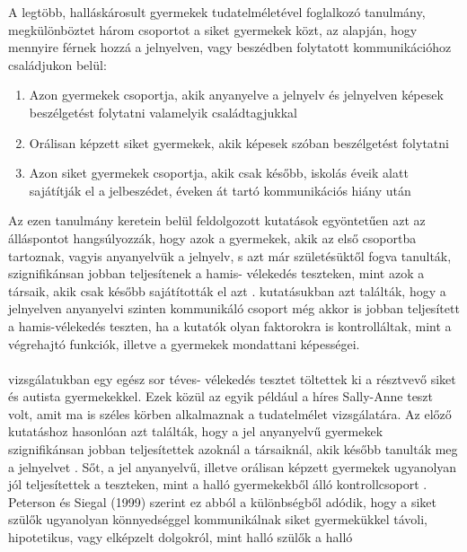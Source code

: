 A legtöbb, halláskárosult gyermekek tudatelméletével foglalkozó tanulmány, megkülön\-böztet
három csoportot a siket gyermekek közt, az alapján, hogy mennyire férnek hozzá a
jelnyelven, vagy beszédben folytatott kommunikációhoz családjukon belül:
\begin{enumerate}
	\item Azon gyermekek csoportja, akik anyanyelve a jelnyelv és jelnyelven képesek
	beszél\-getést folytatni valamelyik családtagjukkal
	\item Orálisan képzett siket gyermekek, akik képesek szóban beszélgetést folytatni
	\item Azon siket gyermekek csoportja, akik csak később, iskolás éveik alatt sajátítják el a
	jelbeszédet, éveken át tartó kommunikációs hiány után
\end{enumerate}
Az ezen tanulmány keretein belül feldolgozott kutatások egyöntetűen azt az álláspontot
hangsúlyozzák, hogy azok a gyermekek, akik az első csoportba tartoznak, vagyis anyanyelvük
a jelnyelv, s azt már születésüktől fogva tanulták, szignifikánsan jobban teljesítenek a hamis-
vélekedés teszteken, mint azok a társaik, akik csak később sajátították el azt \autocite{woolfe_want_siegal_2002,peterson_siegal_1999,peterson_slaughter_2006,schick_villiers_villiers_hoffmeister_2007}.
\textcite{woolfe_want_siegal_2002} kutatásukban azt találták, hogy a jelnyelven anyanyelvi
szinten kommunikáló csoport még akkor is jobban teljesített a hamis-vélekedés teszten, ha a
kutatók olyan faktorokra is kontrolláltak, mint a végrehajtó funkciók, illetve a gyermekek
mondattani képességei.\\
\\
 \textcite{peterson_siegal_1999} vizsgálatukban egy egész sor téves-
vélekedés tesztet töltettek ki a résztvevő siket és autista gyermekekkel. Ezek közül az egyik például a híres Sally-Anne teszt \autocite{baron-cohen_leslie_frith_1985} volt, amit ma is széles körben alkalmaznak a tudatelmélet vizsgálatára. Az előző kutatáshoz
hasonlóan azt találták, hogy a jel anyanyelvű gyermekek szignifikánsan jobban teljesítettek
azoknál a társaiknál, akik később tanulták meg a jelnyelvet \autocite{peterson_siegal_1999}. Sőt, a jel anyanyelvű,
illetve orálisan képzett gyermekek ugyanolyan jól teljesítettek a teszteken, mint a halló
gyermekekből álló kontrollcsoport \autocite{peterson_siegal_1999}. Peterson és Siegal (1999) szerint ez abból a
különbségből adódik, hogy a siket szülők ugyanolyan könnyedséggel kommunikálnak siket
gyermekükkel távoli, hipotetikus, vagy elképzelt dolgokról, mint halló szülők a halló
